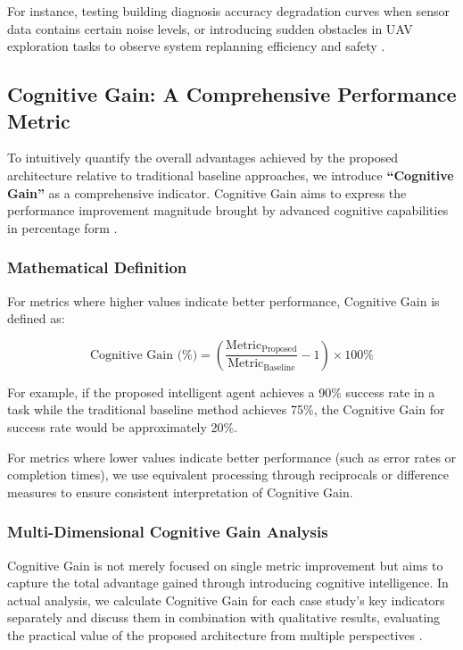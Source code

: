 For instance, testing building diagnosis accuracy degradation curves when sensor data contains certain noise levels, or introducing sudden obstacles in UAV exploration tasks to observe system replanning efficiency and safety \cite{grande2012scan}.

\subsection{Cognitive Gain: A Comprehensive Performance Metric}

To intuitively quantify the overall advantages achieved by the proposed architecture relative to traditional baseline approaches, we introduce \textbf{``Cognitive Gain''} as a comprehensive indicator. Cognitive Gain aims to express the performance improvement magnitude brought by advanced cognitive capabilities in percentage form \cite{stone2016artificial}.

\subsubsection{Mathematical Definition}

For metrics where higher values indicate better performance, Cognitive Gain is defined as:

\begin{equation}
\text{Cognitive Gain (\%)} = \left(\frac{\text{Metric}_{\text{Proposed}}}{\text{Metric}_{\text{Baseline}}} - 1\right) \times 100\%
\end{equation}

For example, if the proposed intelligent agent achieves a 90\% success rate in a task while the traditional baseline method achieves 75\%, the Cognitive Gain for success rate would be approximately 20\%.

For metrics where lower values indicate better performance (such as error rates or completion times), we use equivalent processing through reciprocals or difference measures to ensure consistent interpretation of Cognitive Gain.

\subsubsection{Multi-Dimensional Cognitive Gain Analysis}

Cognitive Gain is not merely focused on single metric improvement but aims to capture the total advantage gained through introducing cognitive intelligence. In actual analysis, we calculate Cognitive Gain for each case study's key indicators separately and discuss them in combination with qualitative results, evaluating the practical value of the proposed architecture from multiple perspectives \cite{hernandez2022measuring}.

